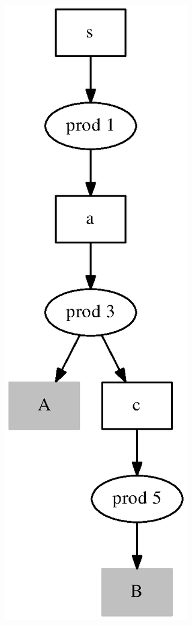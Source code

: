 \documentclass{acm_proc_article-sp}
\begin{document}
\begin{figure}[h!]
  \begin{center}
    	\begin{subfigure}{0.2\textwidth}    
    		\includegraphics[scale=0.3]{graphs/SPPF_proof_fst.eps}    

\end{subfigure}
\end{center}
\end{figure}
\end{document}
